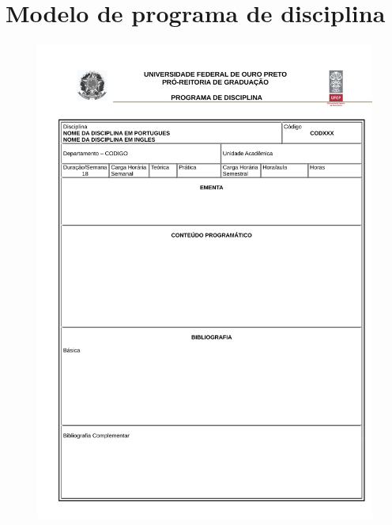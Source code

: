 \chapter{Modelo de programa de disciplina} 
\label{ape:03} 
%
\begin{figure}[p]
	\centering 
	\includegraphics[scale=0.7]{capitulos/modelo-programa/pdp1.pdf}
\end{figure}

